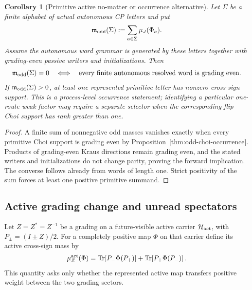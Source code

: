 \documentclass[11pt]{article}
\numberwithin{equation}{section}
\newtheorem{corollary}[theorem]{Corollary}
\theoremstyle{definition}
\theoremstyle{remark}
\newcommand{\Tr}{\operatorname{Tr}}
\newcommand{\Hh}{\mathcal H}
\begin{document}
\begin{corollary}[Primitive active no-matter or occurrence alternative]
\label{cor:primitive-odd-alternative}
Let $\Sigma$ be a finite alphabet of actual autonomous CP letters and put
\begin{equation}
\mathfrak m_{\rm odd}(\Sigma)
:=\sum_{a\in\Sigma}\mu_J(\Phi_a).
\label{eq:primitive-odd-profile}
\end{equation}
Assume the autonomous word grammar is generated by these letters together with
grading-even passive writers and initializations.  Then
\begin{equation}
\mathfrak m_{\rm odd}(\Sigma)=0
\quad\Longleftrightarrow\quad
\text{every finite autonomous resolved word is grading even}.
\label{eq:primitive-odd-stop}
\end{equation}
If $\mathfrak m_{\rm odd}(\Sigma)>0$, at least one represented primitive
letter has nonzero cross-sign support.  This is a process-level occurrence
statement; identifying a particular one-route weak factor may require a
separate selector when the corresponding flip Choi support has rank greater
than one.
\end{corollary}

\begin{proof}
A finite sum of nonnegative odd masses vanishes exactly when every primitive
Choi support is grading even by Proposition~\ref{thm:odd-choi-occurrence}.
Products of grading-even Kraus directions remain grading even, and the stated
writers and initializations do not change parity, proving the forward
implication.  The converse follows already from words of length one.  Strict
positivity of the sum forces at least one positive primitive summand.
\end{proof}


\subsection{Active grading change and unread spectators}

Let $Z=Z^*=Z^{-1}$ be a grading on a future-visible active carrier
$\Hh_{\rm act}$, with $P_\pm=(I\pm Z)/2$.  For a completely positive map
$\Phi$ on that carrier define its active cross-sign mass by
\begin{equation}
\mu_Z^{\rm act}(\Phi)
=
\Tr\!\left[P_-\Phi(P_+)\right]
+
\Tr\!\left[P_+\Phi(P_-)\right].
\label{eq:active-cross-sign-mass}
\end{equation}
This quantity asks only whether the represented active map transfers positive
weight between the two grading sectors.
\end{document}
